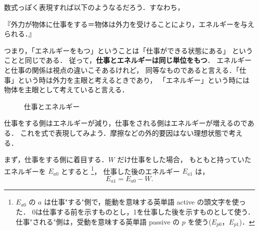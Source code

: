                 数式っぽく表現すれば以下のようなるだろう．すなわち，
                    \begin{center}
                        『外力が物体に仕事をする＝物体は外力を受けることにより，エネルギーを与えられる．』
                    \end{center}
                つまり，「エネルギーをもつ」ということは「仕事ができる状態にある」
                ということと同じである．
                従って，\textbf{仕事とエネルギーは同じ単位をもつ}．
                エネルギーと仕事の関係は視点の違いこそあるけれど，
                同等なものであると言える．「仕事」という時は外力を主眼と考えるときであり，
                「エネルギー」という時には物体を主眼として考えていると言える．
                    \begin{figure}[hbt]
                        \begin{center}
                            \caption{仕事とエネルギー}
                            \label{fig:ENERGY_1}
                        \end{center}
                    \end{figure}

                                仕事をする側はエネルギーが減り，仕事をされる側はエネルギーが増えるのである．
                                これを式で表現してみよう．摩擦などの外的要因はない理想状態で考える．

                                まず，仕事をする側に着目する．$W$ だけ仕事をした場合，
                                もともと持っていたエネルギーを $E_{a0}$ とすると
                                        \footnote{
                                                $E_{a0}$ の $a$ は仕事"する"側で，能動を意味する英単語 active の頭文字を使った．
                                                0は仕事する前を示すものとし，1を仕事した後を示すものとして使う．
                                                仕事"される"側は，受動を意味する英単語 passive の $p$ を使う($E_{p0}$，$E_{p1}$)．
                                        }，
                                仕事した後のエネルギー $E_{a1}$ は，
                                        \begin{equation*}
                                                E_{a1} = E_{a0}-W.
                                        \end{equation*}

